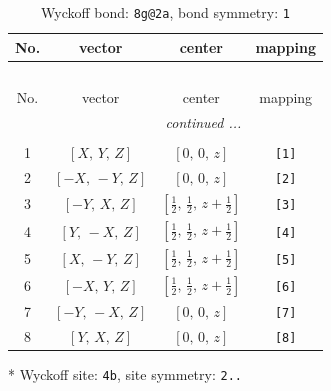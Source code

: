 \documentclass[fleqn,8pt]{jsarticle}
\begin{document}
\renewcommand{\arraystretch}{1.2}
\begin{longtable}{cccc}
\caption{Wyckoff bond: {\tt 8g@2a}, bond symmetry: {\tt 1}}
 \\
 \hline \hline
No. & vector & center & mapping \\ \hline \endfirsthead

\multicolumn{3}{l}{\tablename\ \thetable{}} \\
 \hline \hline
No. & vector & center & mapping \\ \hline \endhead

 \hline \hline
\multicolumn{3}{r}{\footnotesize\it continued ...} \\ \endfoot

 \hline \hline
\multicolumn{3}{r}{} \\ \endlastfoot

1 & $\left[ X,\, Y,\, Z \right]$ & $\left[ 0,\, 0,\, z \right]$ & {\tt [1]} \\ \hline
2 & $\left[ - X,\, - Y,\, Z \right]$ & $\left[ 0,\, 0,\, z \right]$ & {\tt [2]} \\ \hline
3 & $\left[ - Y,\, X,\, Z \right]$ & $\left[ \frac{1}{2},\, \frac{1}{2},\, z + \frac{1}{2} \right]$ & {\tt [3]} \\ \hline
4 & $\left[ Y,\, - X,\, Z \right]$ & $\left[ \frac{1}{2},\, \frac{1}{2},\, z + \frac{1}{2} \right]$ & {\tt [4]} \\ \hline
5 & $\left[ X,\, - Y,\, Z \right]$ & $\left[ \frac{1}{2},\, \frac{1}{2},\, z + \frac{1}{2} \right]$ & {\tt [5]} \\ \hline
6 & $\left[ - X,\, Y,\, Z \right]$ & $\left[ \frac{1}{2},\, \frac{1}{2},\, z + \frac{1}{2} \right]$ & {\tt [6]} \\ \hline
7 & $\left[ - Y,\, - X,\, Z \right]$ & $\left[ 0,\, 0,\, z \right]$ & {\tt [7]} \\ \hline
8 & $\left[ Y,\, X,\, Z \right]$ & $\left[ 0,\, 0,\, z \right]$ & {\tt [8]} \\
\end{longtable}
* Wyckoff site: {\tt 4b}, site symmetry: {\tt 2..}
\renewcommand{\arraystretch}{1.2}
\end{document}
